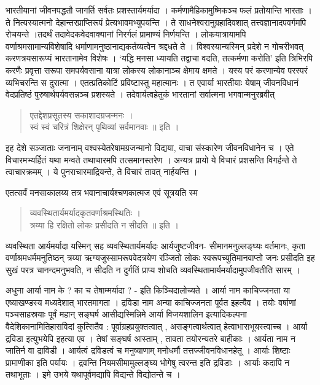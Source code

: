 {भारतीयानां जीवनपद्धतौ जागर्ति सर्वतः प्रशस्तार्यमर्यादा । कर्मणामैहिकामुष्मिकञ्च फलं प्रतोयान्ति भारताः । ते नित्यस्यात्मनो देहान्तरप्राप्तिरूपं प्रेत्यभावमभ्युपयन्ति । ते साधनेश्वरानुग्रहादिवशात् तत्त्वज्ञानादपवर्गमपि रोचयन्ते ।तदर्थं तदावेदकवेदवाक्यानां निरर्गलं प्रामाण्यं निर्णयन्ति । लोकयात्रायामपि वर्णाश्रमसामान्यविशेषादि धर्माणामनुष्ठानाद्यकर्तव्यत्वेन श्रद्दधते ते । विश्वस्यान्यस्मिन् प्रदेशे न गोचरीभवत् करणत्रयसारूप्यं भारतानामेव विशेषः  । ‘यद्धि मनसा ध्यायति  तद्वाचा वदति, तत्कर्मणा करोति’ इति त्रिभिरपि करणैः प्रवृत्ता सरूपा समपर्यवसाना यात्रा लोकस्य लोकानाञ्च क्षेमाय क्षमते । यस्य परं करणान्येव परस्परं व्यभिचरन्ति स दुरात्मा । एतत्प्रतिकोटिं प्रविष्टास्तु महात्मानः । त एवार्या भारतीयाः येषाम् जीवनविधानं वेदप्रतिष्ठं पुरुषार्थपर्यवसन्नञ्च प्रशस्यते । तदेवार्यत्वहेतुकं भारतानां सर्वात्मना भगवान्मनुरब्रवीत्  
\begin{verse}
एतद्देशप्रसूतस्य सकाशादग्रजन्मनः ।\\
स्वं स्वं चरित्रं शिक्षेरन् पृथिव्यां सर्वमानवाः ॥ इति ।
\end{verse}
इह देशे सञ्जाताः जनानाम् वश्वस्येतरेषामग्रजन्मानो विद्यया, वाचा संस्कारेण जीवनविधानेन च । एते विचारमभ्यर्हितं यथा मन्वते तथाचारमपि तत्समानस्तरेण । अन्यत्र प्रायो ये विचारं प्रशसन्ति विगर्हन्ते ते त्वाचारक्रमम् । ये पुनराचारमाद्रियन्ते, ते विचारं तावत् नार्हयन्ति ।

एतत्सर्वं मनसाकालय्य तत्र भवानाचार्यश्चणकात्मज एवं सूत्रयति स्म 
\begin{verse}
व्यवस्थितार्यमर्यादकृतवर्णाश्रमस्थितिः । \\
त्रय्या हि रक्षितो लोकः प्रसीदति न सीदति ॥ इति ।
\end{verse}
व्यवस्थिता आर्यमर्यादा यस्मिन् सह व्यवस्थितार्यमर्यादः आर्यजुष्टजीवन- सीमानमनुल्लङ्घ्यः वर्तमानः, कृता वर्णाश्रमधर्ममनुतिष्ठन् त्रय्या ऋग्यजुस्सामरूपवेदत्रयेण रञ्जितो लोकः स्वरूपच्युतिमानवाप्तो जनः प्रसीदति इह सुखं परत्र चानन्दमनुभवति, न सीदति न दुर्गतिं प्राप्य शोचति व्यवस्थितामार्यमर्यादामुपजीवतीति सारम् ।

अधुना आर्या नाम के ? का च तेषाम्मर्यादा ? - इति किञ्चिदालोच्यते । आर्या नाम काचिज्जनता या एष्याखण्डस्य मध्यदेशात् भारतमागता । द्रविडा नाम अन्या काचिज्जनता पूर्वत इहत्यैव । तयोः वर्षाणां पञ्चसाहस्रयाः पूर्वं महान् सङ्घर्ष आसीद्यस्मिन्निमे आर्या विजयशालिन इत्यादिकल्पना वैदेशिकानामितिहासविदां कुत्सितैव : पूर्वाग्रहप्रयुक्तत्वात् , असङ्गत्वार्थत्वात् हेत्वाभासभूयस्त्वाच्च । आर्या द्रविडा इत्युभयेपि इहत्या एव । तेषां सङ्घर्ष आस्ताम् , तावता तयोरन्यतरे बाहीकाः । आर्यता नाम न जातिर्न वा द्राविडी । आर्यत्वं द्रविडत्वं च मनुष्याणाम् मनोधर्मौ तत्तज्जीवनविधानहेतू । आर्याः शिष्टाः प्रामाणीका इति पर्यायः । द्रवन्ति नियमसीमामुल्लङ्घ्य भोगेषु त्वरन्त इति द्रविडाः । आर्याः कदापि न तथाभूताः । इमे उभये यथापूर्वमद्यापि विद्यन्ते विद्योतन्ते च । 

}
